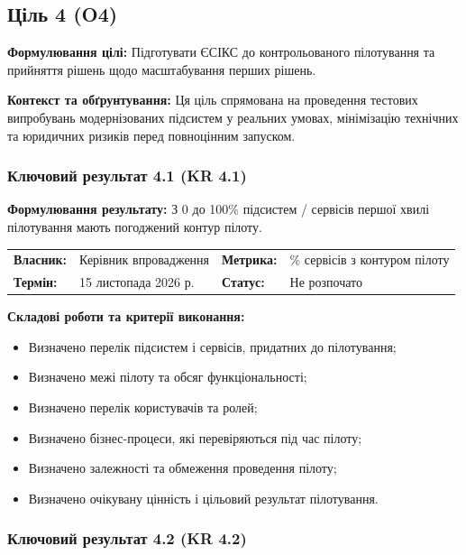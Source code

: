 \documentclass{article}
\begin{document}
\newpage

\subsection{Ціль 4 (O4)}

\textbf{Формулювання цілі:} Підготувати ЄСІКС до контрольованого пілотування та прийняття рішень щодо масштабування перших рішень.

\textbf{Контекст та обґрунтування:}
Ця ціль спрямована на проведення тестових випробувань модернізованих підсистем у реальних умовах, мінімізацію технічних та юридичних ризиків перед повноцінним запуском.

\subsubsection{Ключовий результат 4.1 (KR 4.1)}

\textbf{Формулювання результату:} З 0 до 100\% підсистем / сервісів першої хвилі пілотування мають погоджений контур пілоту.

\noindent\begin{tabular}{@{}p{2.2cm}p{4.5cm}p{2.2cm}p{4.5cm}@{}}
\toprule
\textbf{Власник:} & Керівник впровадження & \textbf{Метрика:} & \% сервісів з контуром пілоту \\
\textbf{Термін:} & 15 листопада 2026 р. & \textbf{Статус:} & Не розпочато \\
\bottomrule
\end{tabular}

\vspace{10pt}
\textbf{Складові роботи та критерії виконання:}
\begin{itemize}
    \item Визначено перелік підсистем і сервісів, придатних до пілотування;
    \item Визначено межі пілоту та обсяг функціональності;
    \item Визначено перелік користувачів та ролей;
    \item Визначено бізнес-процеси, які перевіряються під час пілоту;
    \item Визначено залежності та обмеження проведення пілоту;
    \item Визначено очікувану цінність і цільовий результат пілотування.
\end{itemize}

\subsubsection{Ключовий результат 4.2 (KR 4.2)}
\end{document}
